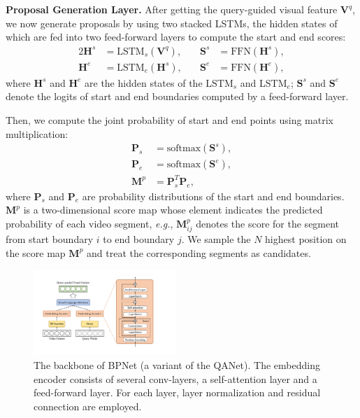 \documentclass[letterpaper]{article} %
\newcommand{\eg}{\emph{e.g.}}
\begin{document}
\noindent\textbf{Proposal Generation Layer.}
After getting the query-guided visual feature $\bm{V}^{q}$, 
we now generate proposals by using two stacked LSTMs, the hidden states of which are fed into two feed-forward layers to compute the start and end scores:
\begin{alignat}{2}
\bm{H}^{s}&= \text{LSTM}_{s}(\bm{V}^{q}), \quad &\bm{S}^{s}&= \text{FFN}(\bm{H}^{s}), \\
\bm{H}^{e}&= \text{LSTM}_{e}(\bm{H}^{s}), \quad &\bm{S}^{e}&= \text{FFN}(\bm{H}^{e}),
\label{equation45}
\end{alignat}
where $\bm{H}^{s}$ and $\bm{H}^{e}$ are the hidden states of the 
$\text{LSTM}_{s}$ and $\text{LSTM}_{e}$; $\bm{S}^{s}$ and $\bm{S}^{e}$ denote the logits of start and end boundaries computed by a feed-forward layer.

Then, we compute the joint probability of start and end points using 
matrix multiplication:
\begin{equation}
\begin{split}
\bm{P}_{s}&=\text{softmax}(\bm{S}^{s}), \\
\bm{P}_{e}&=\text{softmax}(\bm{S}^{e}), \\
\bm{M}^{p} &= \bm{P}_{s}^{T}\bm{P}_{e},
\end{split}
\label{equation6}
\end{equation}
where $\bm{P}_{s}$ and $\bm{P}_{e}$ are probability distributions of the start and end boundaries.
$\bm{M}^{p}$ is a two-dimensional score map whose element indicates the predicted probability 
of each video segment, \eg, $\bm{M}^{p}_{ij}$ denotes the score for the segment from start boundary $i$ to 
end boundary $j$. 
We sample the $N$ highest position on the score map $\bm{M}^{p}$ and treat the corresponding segments as 
candidates.

\begin{figure}[t]
    \centering
    \includegraphics[width=0.48\textwidth]{figure3_1_cut.pdf} %
    \caption{The backbone of BPNet (a variant of the QANet). 
    The embedding encoder consists of several conv-layers, a self-attention layer and a feed-forward layer. For each layer, layer normalization and residual connection are employed.
    }
    \label{figure3}
\end{figure}
\end{document}
